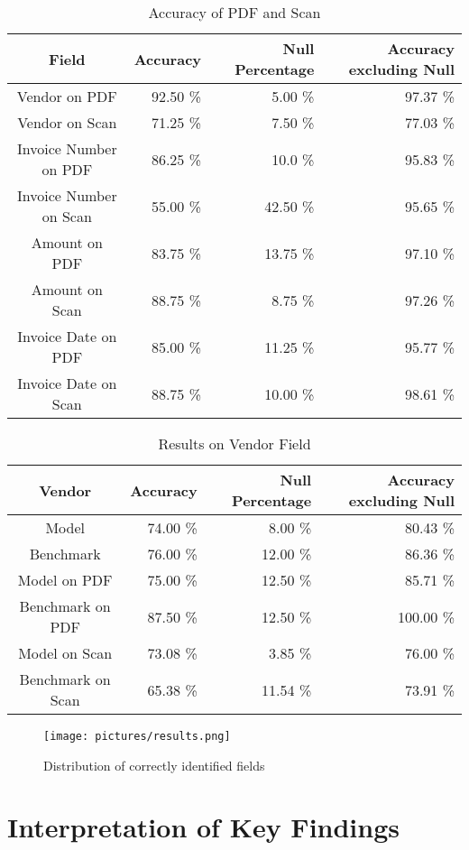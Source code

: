 \begin{table}[ht]   %
    \centering
    \footnotesize
    \begin{tabular}{c|rrr} %
        \toprule    %
        Field  & Accuracy  & Null Percentage & Accuracy excluding Null \\
        \midrule    %
        Vendor on PDF    & 92.50 \%   &  5.00 \%   & 97.37 \% \\
        Vendor on Scan   & 71.25 \%   &  7.50 \%   & 77.03 \% \\
        \midrule    %
        Invoice Number on PDF & 86.25 \%   & 10.0 \%  & 95.83 \%\\
        Invoice Number on Scan & 55.00 \%  & 42.50 \%  & 95.65 \%\\
        \midrule    %
        Amount on PDF      & 83.75 \%   & 13.75 \%  & 97.10 \% \\
        Amount on Scan     & 88.75 \%   & 8.75 \%  & 97.26 \% \\
        \midrule    %
        Invoice Date on PDF  & 85.00 \%   & 11.25  \%  & 95.77 \% \\
        Invoice Date on Scan & 88.75 \%   & 10.00  \%  & 98.61 \% \\
        
        \bottomrule %
    \end{tabular}
    \caption{Accuracy of PDF and Scan}
    \label{table:Field_Com_Scan_PDF}
\end{table}


\begin{table}[ht]   %
    \centering
    \footnotesize
    \begin{tabular}{c|rrr} %
        \toprule    %
        Vendor  & Accuracy  & Null Percentage & Accuracy excluding Null \\
        \midrule    %
        Model               & 74.00 \%   & 8.00 \%   & 80.43 \% \\
        Benchmark           & 76.00 \%   & 12.00 \%  & 86.36 \%\\
        \midrule    %
        Model on PDF        & 75.00 \%   & 12.50 \%  & 85.71 \% \\
        Benchmark on PDF    & 87.50 \%   & 12.50 \%  & 100.00 \% \\
        \midrule    %
        Model on Scan       & 73.08 \%  & 3.85 \%   & 76.00 \% \\
        Benchmark on Scan   & 65.38 \%  & 11.54 \%  & 73.91 \% \\

        \bottomrule %
    \end{tabular}
    \caption{Results on Vendor Field}
    \label{table:Model_Bench_Vendor}
\end{table}



\begin{figure}[ht]
    \centering 
    \texttt{[image: pictures/results.png]}
    \caption{Distribution of correctly identified fields}
    \label{pic:results_1}    %
\end{figure}
\section{Interpretation of Key Findings}